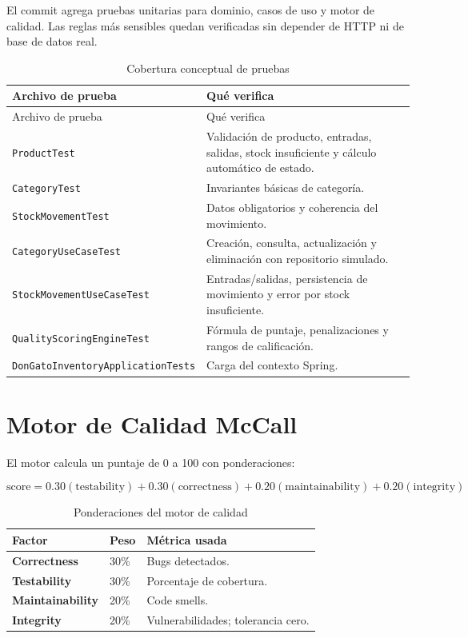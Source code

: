 \documentclass[11pt,oneside]{report}
\begin{document}
El commit agrega pruebas unitarias para dominio, casos de uso y motor de calidad. Las reglas más sensibles quedan verificadas sin depender de HTTP ni de base de datos real.

\begin{longtable}{p{5.6cm} p{8.7cm}}
\caption{Cobertura conceptual de pruebas}\\
\toprule
Archivo de prueba & Qué verifica \\
\midrule
\endfirsthead
\toprule
Archivo de prueba & Qué verifica \\
\midrule
\endhead
\texttt{ProductTest} & Validación de producto, entradas, salidas, stock insuficiente y cálculo automático de estado.\\
\texttt{CategoryTest} & Invariantes básicas de categoría.\\
\texttt{StockMovementTest} & Datos obligatorios y coherencia del movimiento.\\
\texttt{CategoryUseCaseTest} & Creación, consulta, actualización y eliminación con repositorio simulado.\\
\texttt{StockMovementUseCaseTest} & Entradas/salidas, persistencia de movimiento y error por stock insuficiente.\\
\texttt{QualityScoringEngineTest} & Fórmula de puntaje, penalizaciones y rangos de calificación.\\
\texttt{DonGatoInventoryApplicationTests} & Carga del contexto Spring.\\
\bottomrule
\end{longtable}

\section{Motor de Calidad McCall}

El motor calcula un puntaje de 0 a 100 con ponderaciones:

\[
\text{score} =
0.30(\text{testability}) +
0.30(\text{correctness}) +
0.20(\text{maintainability}) +
0.20(\text{integrity})
\]

\begin{table}[h!]
\centering
\caption{Ponderaciones del motor de calidad}
\begin{tabularx}{\textwidth}{>{\bfseries}p{4cm} p{3cm} X}
\toprule
Factor & Peso & Métrica usada \\
\midrule
Correctness & 30\% & Bugs detectados.\\
Testability & 30\% & Porcentaje de cobertura.\\
Maintainability & 20\% & Code smells.\\
Integrity & 20\% & Vulnerabilidades; tolerancia cero.\\
\bottomrule
\end{tabularx}
\end{table}
\end{document}
